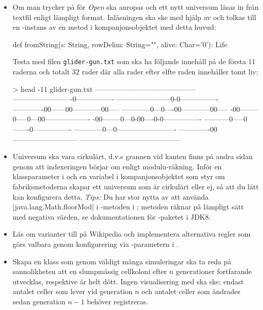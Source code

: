 \begin{itemize}[nosep, label={$\square$}]
\item Om man trycker på  för \emph{Open} ska  anropas och ett nytt universum läsas in från textfil enligt lämpligt format. Inläsningen ska ske med hjälp av  och tolkas till en -instans av en metod i kompanjonsobjektet med detta huvud:
\begin{CodeSmall}
def fromString(s: String, rowDelim: String="\n", alive: Char='0'): Life
\end{CodeSmall}
Testa med filen \texttt{glider-gun.txt} som ska ha följande innehåll på de första 11 raderna och totalt 32 rader där alla rader efter elfte raden innehåller tomt liv:
\begin{REPLnonum}
> head -11 glider-gun.txt
------------------------------------------
-------------------------0----------------
-----------------------0-0----------------
-------------00------00------------00-----
------------0---0----00------------00-----
-00--------0-----0---00-------------------
-00--------0---0-00----0-0----------------
-----------0-----0-------0----------------
------------0---0-------------------------
-------------00---------------------------
------------------------------------------
\end{REPLnonum}
\item Universum ska vara cirkulärt, d.v.s grannen vid kanten finns på andra sidan genom att indexeringen börjar om  enligt modulu-räkning. Inför en klassparameter  i  och en variabel  i kompanjonsobjektet  som styr om fabriksmetoderna skapar ett universum som är cirkulärt eller ej, så att du lätt kan konfigurera detta. \emph{Tips:} Du har stor nytta av att använda \code|java.lang.Math.floorMod| i -metoden i ; metoden  räknar på lämpligt sätt med negativa värden, se dokumentationen för -paketet i JDK8.

\item Läs om varianter till  på Wikipedia och implementera alternativa regler som görs valbara genom konfigurering via -parametern i .

\item Skapa en klass  som genom väldigt många simuleringar ska ta reda på sannolikheten att en slumpmässig cellkoloni efter $n$ generationer fortfarande utvecklas, respektive är helt dött. Ingen visualisering med  ska ske; endast antalet celler som lever vid generation $n$ och antalet celler som ändrades sedan generation $n - 1$ behöver registreras.

\end{itemize}




